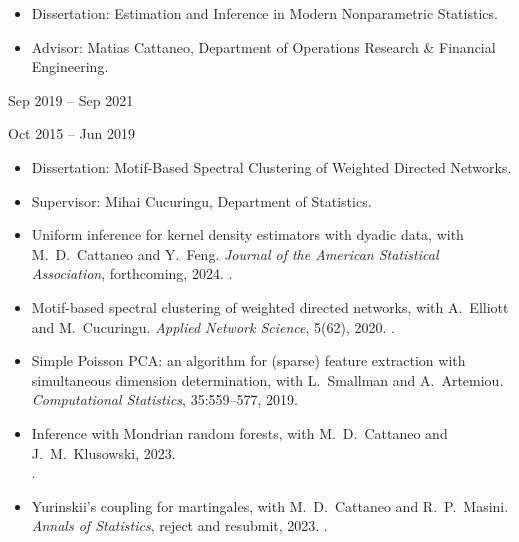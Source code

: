 \documentclass{wgu-cv}
\begin{document}
\begin{itemize}
  \item Dissertation:
    Estimation and Inference in Modern Nonparametric Statistics.
  \item Advisor:
    Matias Cattaneo, Department of Operations Research \& Financial Engineering.
\end{itemize}

{Sep 2019 -- Sep 2021}

\bigskip

{Oct 2015 -- Jun 2019}

\begin{itemize}
  \item Dissertation:
    Motif-Based Spectral Clustering of Weighted Directed Networks.
  \item Supervisor:
    Mihai Cucuringu,
    Department of Statistics.
\end{itemize}


\begin{itemize}

  \item Uniform inference for kernel density estimators with dyadic data,
    with M.\ D.\ Cattaneo and Y.\ Feng.
    \emph{Journal of the American Statistical Association}, forthcoming, 2024.
    .

  \item Motif-based spectral clustering of weighted directed networks,
    with A.\ Elliott and M.\ Cucuringu.
    \emph{Applied Network Science}, 5(62), 2020.
    .

  \item Simple Poisson PCA: an algorithm for (sparse) feature extraction
    with simultaneous dimension determination,
    with L.\ Smallman and A.\ Artemiou.
    \emph{Computational Statistics}, 35:559--577, 2019.

\end{itemize}

\begin{itemize}

  \item Inference with Mondrian random forests,
    with M.\ D.\ Cattaneo and J.\ M.\ Klusowski, 2023. \\
    .

  \item Yurinskii's coupling for martingales,
    with M.\ D.\ Cattaneo and R.\ P.\ Masini.
    \emph{Annals of Statistics}, reject and resubmit, 2023.
    .

\end{itemize}
\end{document}
